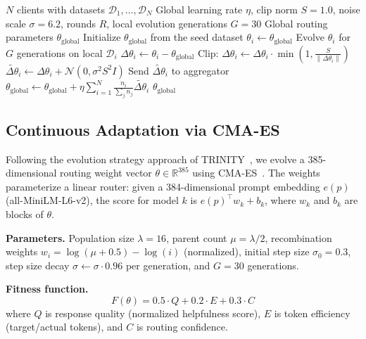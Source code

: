 \documentclass[11pt,a4paper]{article}
\newcommand{\dataset}{\mathcal{D}}
\begin{document}
\begin{algorithm}[t]
\caption{Federated Routing Aggregation (client-level DP)}
\label{alg:federated}
\begin{algorithmic}[1]
\Require $N$ clients with datasets $\dataset_1, \ldots, \dataset_N$
\Require Global learning rate $\eta$, clip norm $S = 1.0$, noise scale $\sigma = 6.2$, rounds $R$, local evolution generations $G = 30$
\Ensure Global routing parameters $\theta_{\text{global}}$
\State Initialize $\theta_{\text{global}}$ from the seed dataset
        \State $\theta_i \gets \theta_{\text{global}}$ 
        \State Evolve $\theta_i$ for $G$ generations on local $\dataset_i$ 
        \State $\Delta\theta_i \gets \theta_i - \theta_{\text{global}}$
        \State Clip: $\Delta\theta_i \gets \Delta\theta_i \cdot \min\left(1, \frac{S}{\|\Delta\theta_i\|}\right)$ 
        \State $\tilde{\Delta\theta}_i \gets \Delta\theta_i + \mathcal{N}(0, \sigma^2 S^2 I)$ 
        \State Send $\tilde{\Delta\theta}_i$ to aggregator
    \EndFor
    \State $\theta_{\text{global}} \gets \theta_{\text{global}} + \eta \sum_{i=1}^N \frac{n_i}{\sum_j n_j} \tilde{\Delta\theta}_i$
\EndFor
\State \Return $\theta_{\text{global}}$
\end{algorithmic}
\end{algorithm}

\subsection{Continuous Adaptation via CMA-ES}
\label{sec:cmaes}

Following the evolution strategy approach of TRINITY~\cite{trinity2025}, we evolve a 385-dimensional routing weight vector $\theta \in \mathbb{R}^{385}$ using CMA-ES~\cite{hansen2001}.
The weights parameterize a linear router: given a 384-dimensional prompt embedding $e(p)$ (all-MiniLM-L6-v2), the score for model $k$ is $e(p)^\top w_k + b_k$, where $w_k$ and $b_k$ are blocks of $\theta$.

\textbf{Parameters.}
Population size $\lambda = 16$, parent count $\mu = \lambda/2$, recombination weights $w_i = \log(\mu + 0.5) - \log(i)$ (normalized), initial step size $\sigma_0 = 0.3$, step size decay $\sigma \leftarrow \sigma \cdot 0.96$ per generation, and $G = 30$ generations.

\textbf{Fitness function.}
\begin{equation}
    F(\theta) = 0.5 \cdot Q + 0.2 \cdot E + 0.3 \cdot C
    \label{eq:fitness}
\end{equation}
where $Q$ is response quality (normalized helpfulness score), $E$ is token efficiency (target/actual tokens), and $C$ is routing confidence.
\end{document}
